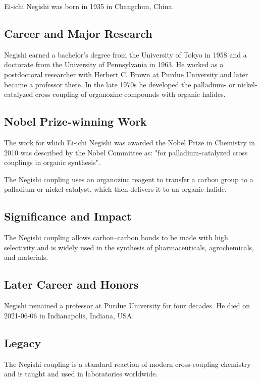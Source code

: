 Ei-ichi Negishi was born in 1935 in Changchun, China.

\subsection*{Career and Major Research}

Negishi earned a bachelor's degree from the University of Tokyo in 1958 and a doctorate from the University of Pennsylvania in 1963. He worked as a postdoctoral researcher with Herbert C. Brown at Purdue University and later became a professor there. In the late 1970s he developed the palladium- or nickel-catalyzed cross coupling of organozinc compounds with organic halides.

\subsection*{Nobel Prize-winning Work}

The work for which Ei-ichi Negishi was awarded the Nobel Prize in Chemistry in 2010 was described by the Nobel Committee as: "for palladium-catalyzed cross couplings in organic synthesis".

The Negishi coupling uses an organozinc reagent to transfer a carbon group to a palladium or nickel catalyst, which then delivers it to an organic halide.

\subsection*{Significance and Impact}

The Negishi coupling allows carbon--carbon bonds to be made with high selectivity and is widely used in the synthesis of pharmaceuticals, agrochemicals, and materials.

\subsection*{Later Career and Honors}

Negishi remained a professor at Purdue University for four decades. He died on 2021-06-06 in Indianapolis, Indiana, USA.

\subsection*{Legacy}

The Negishi coupling is a standard reaction of modern cross-coupling chemistry and is taught and used in laboratories worldwide.

